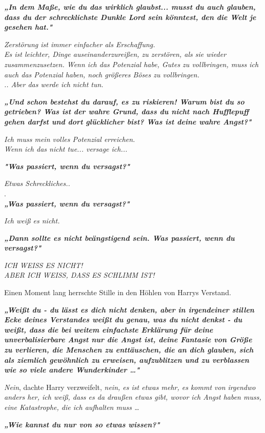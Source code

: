 {\textbf{\emph{„In dem Maße, wie du das wirklich glaubst... musst du auch glauben, dass du der schrecklichste Dunkle Lord sein könntest, den die Welt je gesehen hat."}}

\emph{Zerstörung ist immer einfacher als Erschaffung.\\ Es ist leichter, Dinge auseinanderzureißen, zu zerstören, als sie wieder zusammenzusetzen. Wenn ich das Potenzial habe, Gutes zu vollbringen, muss ich auch das Potenzial haben, noch größeres Böses zu vollbringen.\\ .. Aber das werde ich nicht tun.}

\textbf{\emph{„Und schon bestehst du darauf, es zu riskieren! Warum bist du so getrieben? Was ist der wahre Grund, dass du nicht nach Hufflepuff gehen darfst und dort glücklicher bist? Was ist deine wahre Angst?"}}

\emph{Ich muss mein volles Potenzial erreichen.\\ Wenn ich das nicht tue... versage ich...}

\textbf{\emph{"Was passiert, wenn du versagst?"}}

\emph{Etwas Schreckliches..}\\ .\\ \textbf{\emph{„Was passiert, wenn du versagst?"}}

\emph{Ich weiß es nicht.}

\textbf{\emph{„Dann sollte es nicht beängstigend sein. Was passiert, wenn du versagst?"}}

\emph{ICH WEISS ES NICHT!\\ ABER ICH WEISS, DASS ES SCHLIMM IST!}

Einen Moment lang herrschte Stille in den Höhlen von Harrys Verstand.

\textbf{\emph{„Weißt du - du lässt es dich nicht denken, aber in irgendeiner stillen Ecke deines Verstandes weißt du genau, was du nicht denkst - du weißt, dass die bei weitem einfachste Erklärung für deine unverbalisierbare Angst nur die Angst ist, deine Fantasie von Größe zu verlieren, die Menschen zu enttäuschen, die an dich glauben, sich als ziemlich gewöhnlich zu erweisen, aufzublitzen und zu verblassen wie so viele andere Wunderkinder …"}}

\emph{Nein}, dachte Harry verzweifelt, \emph{nein, es ist etwas mehr, es kommt von irgendwo anders her, ich weiß, dass es da draußen etwas gibt, wovor ich Angst haben muss, eine Katastrophe, die ich aufhalten muss …}

\textbf{\emph{„Wie kannst du nur von so etwas wissen?"}}

}
